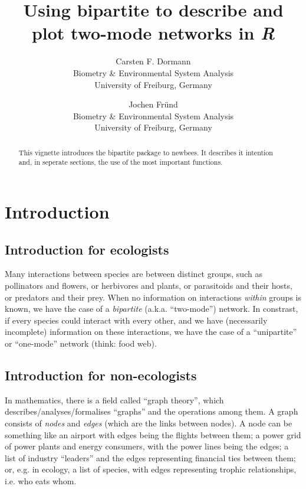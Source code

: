 \documentclass[a4paper, 11pt]{article}\usepackage[]{graphicx}\usepackage[]{color}
\newcommand{\proglang}[1]{\textsl{#1}}
\begin{document}
\title{Using bipartite to describe and plot two-mode networks in \proglang{R}}

\author{Carsten F. Dormann\\Biometry \& Environmental System Analysis\\University of Freiburg, Germany
\and Jochen Fründ\\Biometry \& Environmental System Analysis\\University of Freiburg, Germany}


\maketitle

\begin{abstract}
\noindent This vignette introduces the bipartite package to newbees. It describes it intention and, in seperate sections, the use of the most important functions.
\end{abstract}

\tableofcontents


\section{Introduction}
\subsection{Introduction for ecologists}
Many interactions between species are between distinct groups, such as pollinators and flowers, or herbivores and plants, or parasitoids and their hosts, or predators and their prey. When no information on interactions \emph{within} groups is known, we have the case of a \emph{bipartite} (a.k.a. ``two-mode'') network. In constrast, if every species could interact with every other, and we have (necessarily incomplete) information on these interactions, we have the case of a ``unipartite'' or ``one-mode'' network (think: food web). 

\subsection{Introduction for non-ecologists}
In mathematics, there is a field called ``graph theory'', which describes/analyses/formalises ``graphs'' and the operations among them. A graph consists of \emph{nodes} and \emph{edges} (which are the links between nodes). A node can be something like an airport with edges being the flights between them; a power grid of power plants and energy consumers, with the power lines being the edges; a list of industry ``leaders'' and the edges representing financial ties between them; or, e.g. in ecology, a list of species, with edges representing trophic relationships, i.e. who eats whom.
\end{document}
